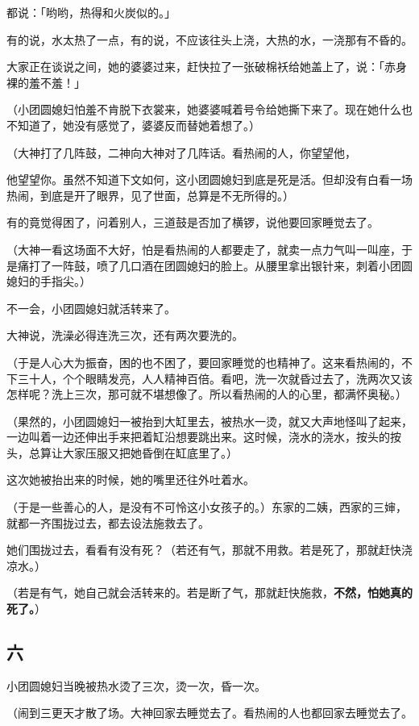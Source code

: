 \documentclass[UTF8]{ctexart}
\begin{document}
都说：「哟哟，热得和火炭似的。」

有的说，水太热了一点，有的说，不应该往头上浇，大热的水，一浇那有不昏的。

大家正在谈说之间，她的婆婆过来，赶快拉了一张破棉袄给她盖上了，说：「赤身裸的羞不羞！」

（小团圆媳妇怕羞不肯脱下衣裳来，她婆婆喊着号令给她撕下来了。现在她什么也不知道了，她没有感觉了，婆婆反而替她着想了。）

（大神打了几阵鼓，二神向大神对了几阵话。看热闹的人，你望望他，

他望望你。虽然不知道下文如何，这小团圆媳妇到底是死是活。但却没有白看一场热闹，到底是开了眼界，见了世面，总算是不无所得的。）

有的竟觉得困了，问着别人，三道鼓是否加了横锣，说他要回家睡觉去了。

（大神一看这场面不大好，怕是看热闹的人都要走了，就卖一点力气叫一叫座，于是痛打了一阵鼓，喷了几口酒在团圆媳妇的脸上。从腰里拿出银针来，刺着小团圆媳妇的手指尖。）

不一会，小团圆媳妇就活转来了。

大神说，洗澡必得连洗三次，还有两次要洗的。

（于是人心大为振奋，困的也不困了，要回家睡觉的也精神了。这来看热闹的，不下三十人，个个眼睛发亮，人人精神百倍。看吧，洗一次就昏过去了，洗两次又该怎样呢？洗上三次，那可就不堪想像了。所以看热闹的人的心里，都满怀奥秘。）

（果然的，小团圆媳妇一被抬到大缸里去，被热水一烫，就又大声地怪叫了起来，一边叫着一边还伸出手来把着缸沿想要跳出来。这时候，浇水的浇水，按头的按头，总算让大家压服又把她昏倒在缸底里了。）

这次她被抬出来的时候，她的嘴里还往外吐着水。

（于是一些善心的人，是没有不可怜这小女孩子的。）东家的二姨，西家的三婶，就都一齐围拢过去，都去设法施救去了。

她们围拢过去，看看有没有死？（若还有气，那就不用救。若是死了，那就赶快浇凉水。）

（若是有气，她自己就会活转来的。若是断了气，那就赶快施救，\textbf{不然，怕她真的死了。}）

\subsection{六}

小团圆媳妇当晚被热水烫了三次，烫一次，昏一次。

（闹到三更天才散了场。大神回家去睡觉去了。看热闹的人也都回家去睡觉去了。
\end{document}
